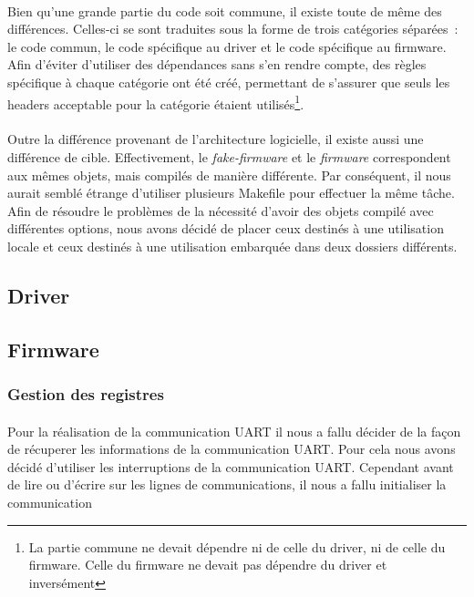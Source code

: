 \paragraph{}
Bien qu'une grande partie du code soit commune, il existe toute de même des
différences. Celles-ci se sont traduites sous la forme de trois catégories
séparées~:
le code commun, le code spécifique au driver et le code spécifique au firmware.
Afin d'éviter d'utiliser des dépendances sans s'en rendre compte, des règles
spécifique à chaque catégorie ont été créé, permettant de s'assurer que seuls
les headers acceptable pour la catégorie étaient utilisés\footnote{La partie
commune ne devait dépendre ni de celle du driver, ni de celle du firmware. Celle
du firmware ne devait pas dépendre du driver et inversément}.

\paragraph{}
Outre la différence provenant de l'architecture logicielle, il existe aussi une
différence de cible. Effectivement, le {\em fake-firmware} et le {\em firmware}
correspondent aux mêmes objets, mais compilés de manière différente. Par
conséquent, il nous aurait semblé étrange d'utiliser plusieurs Makefile pour
effectuer la même tâche. Afin de résoudre le problèmes de la nécessité d'avoir
des objets compilé avec différentes options, nous avons décidé de placer ceux
destinés à une utilisation locale et ceux destinés à une utilisation embarquée
dans deux dossiers différents.

\subsection{Driver}

\subsection{Firmware}

\subsubsection{Gestion des registres}

\paragraph{}
Pour la réalisation de la communication UART il nous a fallu décider de la façon
de récuperer les informations de la communication UART. Pour cela nous avons
décidé d'utiliser les interruptions de la communication UART. Cependant avant de
lire ou d'écrire sur les lignes de communications, il nous a fallu initialiser
la communication

